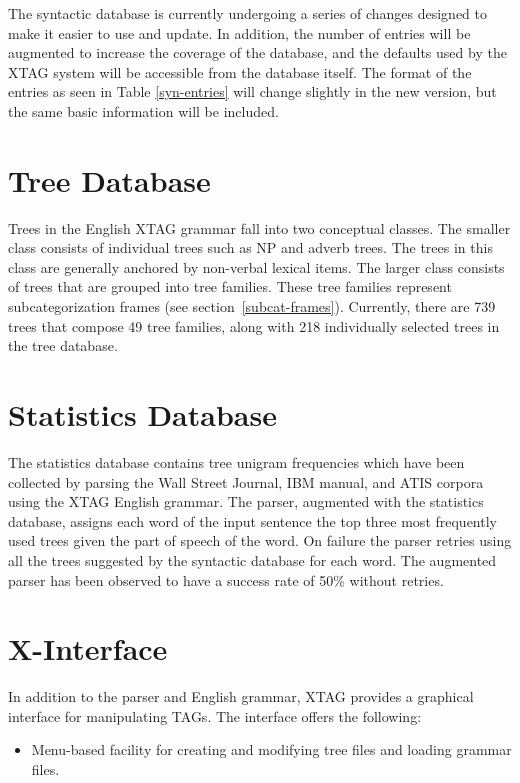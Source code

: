 {The syntactic database is currently undergoing a series of changes
designed to make it easier to use and update.  In addition, the number
of entries will be augmented to increase the coverage of the database,
and the defaults used by the XTAG system will be accessible from the
database itself.  The format of the entries as seen in Table
\ref{syn-entries} will change slightly in the new version, but the
same basic information will be included.

\section{Tree Database} 
\label{tree-db}

Trees in the English XTAG grammar fall into two conceptual classes.
The smaller class consists of individual trees such as NP and adverb
trees.  The trees in this class are generally anchored by non-verbal
lexical items. The larger class consists of trees that are grouped
into tree families.  These tree families represent subcategorization
frames (see section~\ref{subcat-frames}).  Currently, there are 739
trees that compose 49 tree families, along with 218 individually
selected trees in the tree database.


\section{Statistics Database}
\label{stat-db}
The statistics database contains tree unigram frequencies which have been
collected by parsing the Wall Street Journal, IBM manual, and ATIS corpora
using the XTAG English grammar. The parser, augmented with the statistics
database, assigns each word of the input sentence the top three most frequently
used trees given the part of speech of the word. On failure the parser retries
using all the trees suggested by the syntactic database for each word.  The
augmented parser has been observed to have a success rate of 50\% without
retries.

\section{X-Interface}

In addition to the parser and English grammar, XTAG provides a graphical
interface for manipulating TAGs.  The interface offers the following:

\begin{itemize}

\item Menu-based facility for creating and modifying tree files and 
loading grammar files.


\end{itemize}}
